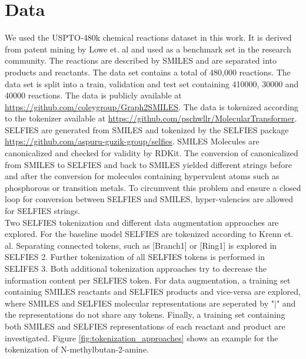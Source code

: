\documentclass[10pt,conference,compsocconf]{IEEEtran}
\begin{document}




\section{Data}

We used the USPTO-480k chemical reactions dataset in this work. It is derived from patent mining by Lowe et. al \cite{lowe_extraction_2012}\cite{jin_predicting_2017} and used as a benchmark set in the research community. The reactions are described by SMILES and are separated into products and reactants. The data set contains a total of 480,000 reactions. The data set is split into a train, validation and test set containing 410000, 30000 and 40000 reactions. The data is publicly available at \url{https://github.com/coleygroup/Graph2SMILES}. The data is tokenized according to the tokenizer available at \url{https://github.com/pschwllr/MolecularTransformer}. SELFIES are generated from SMILES and tokenized by the SELFIES package \url{https://github.com/aspuru-guzik-group/selfies}. SMILES Molecules are canonicalized and checked for validity by RDKit. The conversion of canonicalized from SMILES to SELFIES and back to SMILES yielded different strings before and after the conversion for molecules containing hypervalent atoms such as phosphorous or transition metals. To circumvent this problem and ensure a closed loop for conversion between SELFIES and SMILES, hyper-valencies are allowed for SELFIES strings.\\

Two SELFIES tokenization and different data augmentation approaches are explored. For the baseline model SELFIES are tokenized according to Krenn et. al\cite{SELFIES}. Separating connected tokens, such as [Branch1] or [Ring1] is explored in SELFIES 2. Further tokenization of all SELFIES tokens is performed in SELIFES 3. Both additional tokenization approaches try to decrease the information content per SELFIES token. For data augmentation, a training set containing SMILES reactants and SELFIES products and vice-versa are explored, where SMILES and SELFIES molecular representations are seperated by "$\vert$" and the representations do not share any tokens. Finally, a training set containing both SMILES and SELFIES representations of each reactant and product are investigated. Figure \ref{fig:tokenization_approaches} shows an example for the tokenization of N-methylbutan-2-amine.
\end{document}
